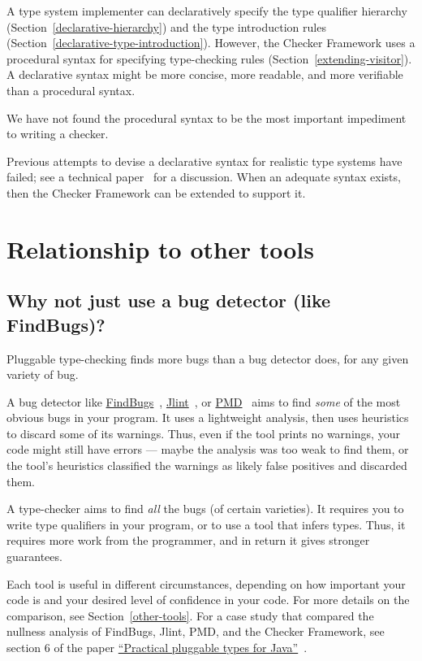 A type system implementer can declaratively specify the type qualifier
hierarchy (Section~\ref{declarative-hierarchy}) and the type introduction rules
(Section~\ref{declarative-type-introduction}).  However, the Checker
Framework uses a procedural syntax for specifying type-checking
rules (Section~\ref{extending-visitor}).
A declarative syntax might be more concise, more readable, and more
verifiable than a procedural syntax.

We have not found the procedural syntax to be the most important impediment
to writing a checker.

Previous attempts to devise a declarative syntax
for realistic type systems have failed; see a technical
paper~\cite{PapiACPE2008} for a discussion.  When an
adequate syntax exists, then the Checker Framework can be extended to
support it.


\section{Relationship to other tools\label{faq-other-tools-section}}


\subsection{Why not just use a bug detector (like FindBugs)?\label{faq-type-checking-vs-bug-detectors}}

Pluggable type-checking finds more bugs than a bug detector does, for any
given variety of bug.

A bug detector like \href{http://findbugs.sourceforge.net/}{FindBugs}~\cite{HovemeyerP2004,HovemeyerSP2005},
\href{http://jlint.sourceforge.net/}{Jlint}~\cite{Artho2001}, or
\href{http://pmd.sourceforge.net/}{PMD}~\cite{Copeland2005} aims to find \emph{some}
of the most obvious bugs in your program.  It uses a lightweight analysis,
then uses heuristics to discard some of its warnings.  Thus, even if the tool
prints no warnings, your code might still have errors --- maybe the
analysis was too weak to find them, or the tool's heuristics classified the
warnings as likely false positives and discarded them.

A type-checker aims to find \emph{all} the bugs (of certain varieties).
It requires you to write type qualifiers in your program, or to use a tool
that infers types.  Thus, it requires more work from the programmer, and in
return it gives stronger guarantees.

Each tool is useful in different circumstances, depending on how important
your code is and your desired level of confidence in your code.  For more
details on the comparison, see Section~\ref{other-tools}.  For a case study
that compared the nullness analysis of FindBugs, Jlint, PMD, and the
Checker Framework, see section 6 of the paper
\href{http://homes.cs.washington.edu/~mernst/pubs/pluggable-checkers-issta2008.pdf}{``Practical pluggable types for Java''}~\cite{PapiACPE2008}.


